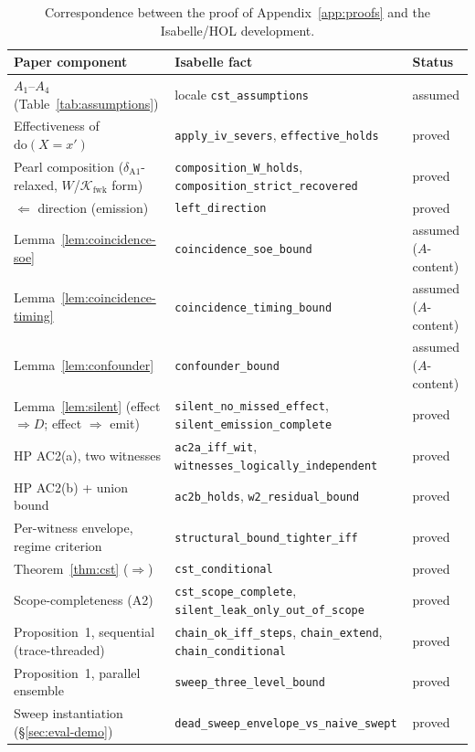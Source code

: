 \documentclass[conference]{IEEEtran}
\newcommand{\Kfwk}{\mathcal{K}_\text{fwk}}
\newcommand{\dox}[1]{\text{do}(X{=}#1)}
\begin{document}
\begin{table}[t]
\centering
\footnotesize
\caption{Correspondence between the proof of Appendix~\ref{app:proofs}
and the Isabelle/HOL development.}
\label{tab:mechanized}
\begin{tabular}{@{}lll@{}}
\toprule
Paper component & Isabelle fact & Status \\
\midrule
$A_1$--$A_4$ (Table~\ref{tab:assumptions}) & locale \texttt{cst\_assumptions} & assumed \\
Effectiveness of $\dox{x'}$ & \texttt{apply\_iv\_severs}, \texttt{effective\_holds} & proved \\
Pearl composition ($\delta_{\text{A1}}$-relaxed, $W$/$\Kfwk$ form) & \texttt{composition\_W\_holds}, \texttt{composition\_strict\_recovered} & proved \\
$\Leftarrow$ direction (emission) & \texttt{left\_direction} & proved \\
Lemma~\ref{lem:coincidence-soe} & \texttt{coincidence\_soe\_bound} & assumed ($A$-content) \\
Lemma~\ref{lem:coincidence-timing} & \texttt{coincidence\_timing\_bound} & assumed ($A$-content) \\
Lemma~\ref{lem:confounder} & \texttt{confounder\_bound} & assumed ($A$-content) \\
Lemma~\ref{lem:silent} (effect $\Rightarrow D$; effect $\Rightarrow$ emit) & \texttt{silent\_no\_missed\_effect}, \texttt{silent\_emission\_complete} & proved \\
HP AC2(a), two witnesses & \texttt{ac2a\_iff\_wit}, \texttt{witnesses\_logically\_independent} & proved \\
HP AC2(b) + union bound & \texttt{ac2b\_holds}, \texttt{w2\_residual\_bound} & proved \\
Per-witness envelope, regime criterion & \texttt{structural\_bound\_tighter\_iff} & proved \\
Theorem~\ref{thm:cst} ($\Rightarrow$) & \texttt{cst\_conditional} & proved \\
Scope-completeness (A2) & \texttt{cst\_scope\_complete}, \texttt{silent\_leak\_only\_out\_of\_scope} & proved \\
Proposition~1, sequential (trace-threaded) & \texttt{chain\_ok\_iff\_steps}, \texttt{chain\_extend}, \texttt{chain\_conditional} & proved \\
Proposition~1, parallel ensemble & \texttt{sweep\_three\_level\_bound} & proved \\
Sweep instantiation (\S\ref{sec:eval-demo}) & \texttt{dead\_sweep\_envelope\_vs\_naive\_swept} & proved \\

\end{tabular}
\end{table}
\end{document}
